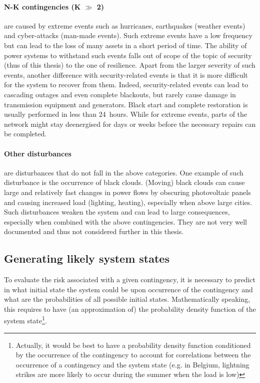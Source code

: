 \paragraph*{N-K contingencies (K \(\gg\) 2)} are caused by extreme events such as hurricanes, earthquakes (weather events) and cyber-attacks (man-made events). Such extreme events have a low frequency but can lead to the loss of many assets in a short period of time. The ability of power systems to withstand such events falls out of scope of the topic of security (thus of this thesis) to the one of resilience. Apart from the larger severity of such events, another difference with security-related events is that it is more difficult for the system to recover from them. Indeed, security-related events can lead to cascading outages and even complete blackouts, but rarely cause damage in transmission equipment and generators. Black start and complete restoration is usually performed in less than 24~hours. While for extreme events, parts of the network might stay deenergised for days or weeks before the necessary repairs can be completed.


\paragraph*{Other disturbances} are disturbances that do not fall in the above categories. One example of such disturbance is the occurrence of black clouds. (Moving) black clouds can cause large and relatively fast changes in power flows by obscuring photovoltaic panels and causing increased load (lighting, heating), especially when above large cities. Such disturbances weaken the system and can lead to large consequences, especially when combined with the above contingencies. They are not very well documented and thus not considered further in this thesis.



\subsection{Generating likely system states}
\label{sec:init_state}

To evaluate the risk associated with a given contingency, it is necessary to predict in what initial state the system could be upon occurrence of the contingency and what are the probabilities of all possible initial states. Mathematically speaking, this requires to have (an approximation of) the probability density function of the system state\footnote{Actually, it would be best to have a probability density function conditioned by the occurrence of the contingency to account for correlations between the occurrence of a contingency and the system state (e.g. in Belgium, lightning strikes are more likely to occur during the summer when the load is low)}.

